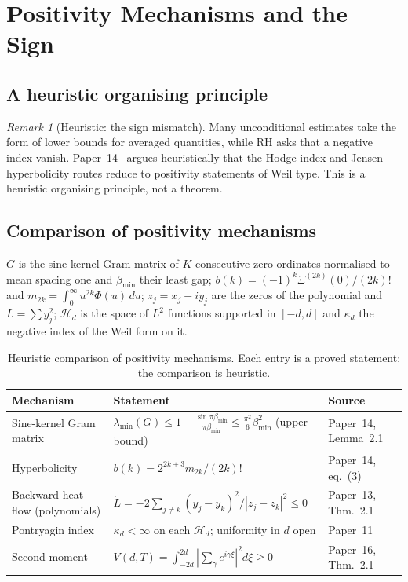\documentclass[11pt]{amsart}
\theoremstyle{definition}
\theoremstyle{remark}
\newtheorem{remark}[theorem]{Remark}
\newcommand{\kap}{\kappa}
\newcommand{\gam}{\gamma}
\begin{document}
\section{Positivity Mechanisms and the Sign}
\label{sec:capstone}

\subsection{A heuristic organising principle}

\begin{remark}[Heuristic: the sign mismatch]
\label{thm:capstone}
Many unconditional estimates take the form of lower bounds for averaged quantities,
while RH asks that a negative index vanish. Paper~14~\cite{P14} argues heuristically that
the Hodge-index and Jensen-hyperbolicity routes reduce to positivity statements of Weil
type. This is a heuristic organising principle, not a theorem.
\end{remark}

\subsection{Comparison of positivity mechanisms}

$G$ is the sine-kernel Gram matrix of $K$ consecutive zero ordinates normalised to mean
spacing one and $\beta_{\min}$ their least gap; $b(k)=(-1)^k\Xi^{(2k)}(0)/(2k)!$ and
$m_{2k}=\int_0^\infty u^{2k}\Phi(u)\,du$; $z_j=x_j+iy_j$ are the zeros of the polynomial and
$L=\sum y_j^2$; $\mathcal H_d$ is the space of $L^2$ functions supported in $[-d,d]$ and
$\kap_d$ the negative index of the Weil form on it.

\begin{table}[h]
\small
\renewcommand{\arraystretch}{1.3}
\centering
\begin{tabularx}{\textwidth}{>{\raggedright\arraybackslash}p{3.0cm}>{\raggedright\arraybackslash}X>{\raggedright\arraybackslash}p{3.0cm}}
\toprule
Mechanism & Statement & Source \\
\midrule
Sine-kernel Gram matrix & $\lambda_{\min}(G)\le1-\frac{\sin\pi\beta_{\min}}{\pi\beta_{\min}}\le\frac{\pi^2}{6}\beta_{\min}^2$ (upper bound) & Paper~14, Lemma~2.1 \\
Hyperbolicity & $b(k)=2^{2k+3}m_{2k}/(2k)!$ & Paper~14, eq.~(3) \\
Backward heat flow (polynomials) & $\dot L=-2\sum_{j\ne k}(y_j-y_k)^2/|z_j-z_k|^2\le0$ & Paper~13, Thm.~2.1 \\
Pontryagin index & $\kap_d<\infty$ on each $\mathcal H_d$; uniformity in $d$ open & Paper~11~\cite[Prop.~2.1 and Rem.~2.2]{P11} \\
Second moment & $V(d,T)=\int_{-2d}^{2d}|\sum_\gam e^{i\gam\xi}|^2d\xi\ge0$ & Paper~16, Thm.~2.1 \\
\bottomrule
\end{tabularx}
\caption{Heuristic comparison of positivity mechanisms. Each entry is a proved
statement; the comparison is heuristic.}
\label{tab:capstone}
\end{table}
\end{document}
